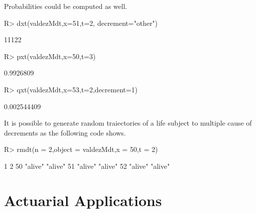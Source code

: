\documentclass[nojss]{jss}
\begin{document}
Probabilities could be computed as well.

\begin{Schunk}
\begin{Sinput}
R> dxt(valdezMdt,x=51,t=2, decrement="other")
\end{Sinput}
\begin{Soutput}
[1] 11122
\end{Soutput}
\begin{Sinput}
R> pxt(valdezMdt,x=50,t=3)
\end{Sinput}
\begin{Soutput}
[1] 0.9926809
\end{Soutput}
\begin{Sinput}
R> qxt(valdezMdt,x=53,t=2,decrement=1)
\end{Sinput}
\begin{Soutput}
[1] 0.002544409
\end{Soutput}
\end{Schunk}

It is possible to generate random traiectories of a life subject to multiple cause of decrements as the following code shows.

\begin{Schunk}
\begin{Sinput}
R> rmdt(n = 2,object = valdezMdt,x = 50,t = 2)
\end{Sinput}
\begin{Soutput}
   1       2      
50 "alive" "alive"
51 "alive" "alive"
52 "alive" "alive"
\end{Soutput}
\end{Schunk}

\section{Actuarial Applications}
\end{document}
